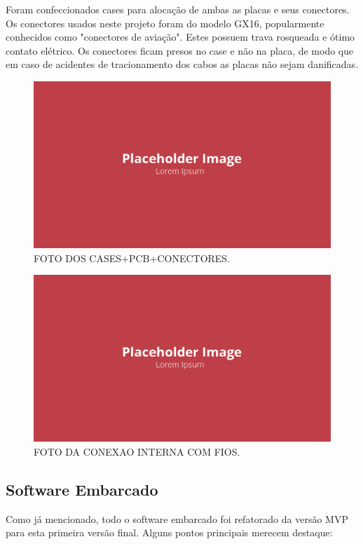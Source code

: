 Foram confeccionados cases para alocação de ambas as placas e seus conectores. Os conectores usados neste projeto foram do modelo GX16, popularmente conhecidos como "conectores de aviação". Estes possuem trava rosqueada e ótimo contato elétrico. Os conectores ficam presos no case e não na placa, de modo que em caso de acidentes de tracionamento dos cabos as placas não sejam danificadas.

\begin{figure}[!ht]
    \centering
    \includegraphics[width=.8\linewidth]{figuras/placeholder.png}
    \caption{FOTO DOS CASES+PCB+CONECTORES\cite{autor}.}
    \label{fig:placeholder}
\end{figure}

\begin{figure}[!ht]
    \centering
    \includegraphics[width=.8\linewidth]{figuras/placeholder.png}
    \caption{FOTO DA CONEXAO INTERNA COM FIOS\cite{autor}.}
    \label{fig:placeholder}
\end{figure}

\subsection{Software Embarcado}

Como já mencionado, todo o software embarcado foi refatorado da versão MVP para esta primeira versão final. Alguns pontos principais merecem destaque:


